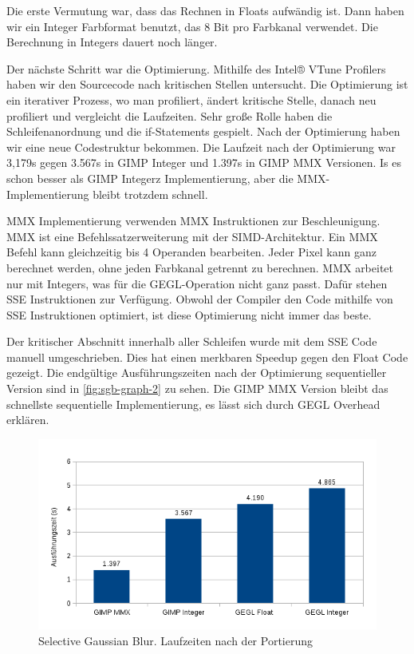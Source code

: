 Die erste Vermutung war, dass das Rechnen in Floats aufwändig ist. Dann haben wir ein Integer Farbformat benutzt, das 8 Bit pro Farbkanal verwendet. Die Berechnung in Integers dauert noch länger.

Der nächste Schritt war die Optimierung. Mithilfe des Intel® VTune Profilers haben wir den Sourcecode nach kritischen Stellen untersucht. Die Optimierung ist ein iterativer Prozess, wo man profiliert, ändert kritische Stelle, danach neu profiliert und vergleicht die Laufzeiten. Sehr große Rolle haben die Schleifenanordnung  und die if-Statements gespielt. Nach der Optimierung haben wir eine neue Codestruktur bekommen. Die Laufzeit nach der Optimierung war 3,179s gegen 3.567s in GIMP Integer und 1.397s in GIMP MMX Versionen. Is es schon besser als GIMP Integerz Implementierung, aber die MMX-Implementierung bleibt trotzdem schnell.

MMX Implementierung verwenden MMX Instruktionen zur Beschleunigung. MMX ist eine Befehlssatzerweiterung mit der SIMD-Architektur. Ein MMX Befehl kann gleichzeitig bis 4 Operanden bearbeiten. Jeder Pixel kann ganz berechnet werden, ohne jeden Farbkanal getrennt zu berechnen. MMX arbeitet nur mit Integers, was für die GEGL-Operation nicht ganz passt. Dafür stehen SSE Instruktionen zur Verfügung. Obwohl der Compiler den Code mithilfe von SSE Instruktionen optimiert, ist diese Optimierung nicht immer das beste.

Der kritischer Abschnitt innerhalb aller Schleifen wurde mit dem SSE Code manuell umgeschrieben. Dies hat einen merkbaren Speedup gegen den Float Code
gezeigt. Die endgültige Ausführungszeiten nach der Optimierung sequentieller Version sind in \autoref{fig:sgb-graph-2} zu sehen. Die GIMP MMX Version bleibt das schnellste sequentielle Implementierung, es lässt sich durch GEGL Overhead erklären.
\begin{figure}
\centering
\includegraphics[scale=0.75]{graphs/sgb-graph-1.png}
\caption{Selective Gaussian Blur. Laufzeiten nach der Portierung}
\label{fig:sgb-graph-1}
\end{figure} 

